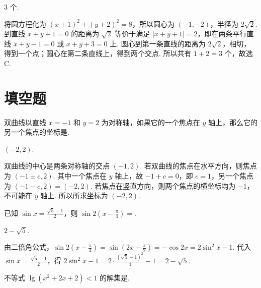 \begin{answer}
\(3\) 个.
\end{answer}

\begin{solution}
将圆方程化为 \((x+1)^2+(y+2)^2=8\)，所以圆心为 \((-1,-2)\)，半径为 \(2\sqrt2\). 到直线 \(x+y+1=0\) 的距离为 \(\sqrt2\) 等价于满足 \(\lvert x+y+1\rvert=2\)，即在两条平行直线 \(x+y-1=0\) 或 \(x+y+3=0\) 上. 圆心到第一条直线的距离为 \(2\sqrt2\)，相切，得到一个点；圆心在第二条直线上，得到两个交点. 所以共有 \(1+2=3\) 个，故选 C.
\end{solution}

\section{填空题}

\begin{problem}
双曲线以直线 \(x = -1\) 和 \(y = 2\) 为对称轴，如果它的一个焦点在 \(y\) 轴上，那么它的另一个焦点的坐标是\fillinblank{}.
\end{problem}

\begin{answer}
\((-2,2)\).
\end{answer}

\begin{solution}
双曲线的中心是两条对称轴的交点 \((-1,2)\). 若双曲线的焦点在水平方向，则焦点为 \((-1\pm c,2)\). 其中一个焦点在 \(y\) 轴上，故 \(-1+c=0\)，即 \(c=1\)，另一个焦点为 \((-1-c,2)=(-2,2)\). 若焦点在竖直方向，则两个焦点的横坐标均为 \(-1\)，不可能在 \(y\) 轴上. 所以所求坐标为 \((-2,2)\).
\end{solution}

\begin{problem}
已知 \(\sin x = \frac{\sqrt{5} - 1}{2}\)，则 \(\sin 2\left(x - \frac{\pi}{4}\right)=\)\fillinblank{}.
\end{problem}

\begin{answer}
\(2-\sqrt{5}\).
\end{answer}

\begin{solution}
由二倍角公式，\(\sin2\left(x-\frac\pi4\right)=\sin\left(2x-\frac\pi2\right)=-\cos2x=2\sin^2x-1\). 代入 \(\sin x=\frac{\sqrt5-1}{2}\)，得 \(2\sin^2x-1=2\cdot\frac{(\sqrt5-1)^2}{4}-1=2-\sqrt5\).
\end{solution}

\begin{problem}
不等式 \(\lg \left(x^{2}+2x+2\right)<1\) 的解集是\fillinblank{}.
\end{problem}


